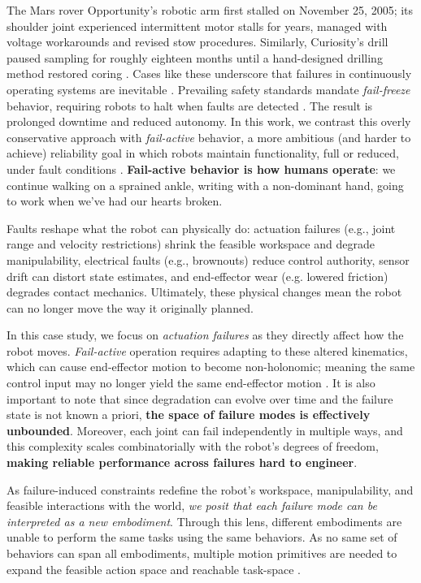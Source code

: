 The Mars rover Opportunity's robotic arm first stalled on November 25, 2005; its shoulder joint experienced intermittent motor stalls for years, managed with voltage workarounds and revised stow procedures. Similarly, Curiosity's drill paused sampling for roughly eighteen months until a hand-designed drilling method restored coring \cite{nasa_science_first_drilled_sample_2018,jpl_opportunity_shoulder_2008}. Cases like these underscore that failures in continuously operating systems are inevitable \cite{factory_efficiency_2020}. Prevailing safety standards mandate \textsl{fail-freeze} behavior, requiring robots to halt when faults are detected \cite{ISO10218-1,ISO13849-1,IEC60204-1}. The result is prolonged downtime and reduced autonomy.
In this work, we contrast this overly conservative approach with \textsl{fail-active} behavior, a more ambitious (and harder to achieve) reliability goal in which robots maintain functionality, full or reduced, under fault conditions \cite{aero_reliability}. \textbf{Fail-active behavior is how humans operate}: we continue walking on a sprained ankle, writing with a non-dominant hand, going to work when we've had our hearts broken.

Faults reshape what the robot can physically do: actuation failures (e.g., joint range and velocity restrictions) shrink the feasible workspace and degrade manipulability, electrical faults (e.g., brownouts) reduce control authority, sensor drift can distort state estimates, and end-effector wear (e.g. lowered friction) degrades contact mechanics. Ultimately, these physical changes mean the robot can no longer move the way it originally planned.

In this case study, we focus on \textit{actuation failures} as they directly affect how the robot moves. \textit{Fail-active} operation requires adapting to these altered kinematics, which can cause end-effector motion to become non-holonomic; meaning the same control input may no longer yield the same end-effector motion \cite{Bloch_Krishnaprasad_Murray_2016}.
It is also important to note that since degradation can evolve over time \cite{barbieri2015sensor} and the failure state is not known a priori, \textbf{the space of failure modes is effectively unbounded}. Moreover, each joint can fail independently in multiple ways, and this complexity scales combinatorially with the robot's degrees of freedom, \textbf{making reliable performance across failures hard to engineer}.

As failure-induced constraints redefine the robot's workspace, manipulability, and feasible interactions with the world, \textsl{we posit that each failure mode can be interpreted as a new embodiment}.
Through this lens, different embodiments are unable to perform the same tasks using the same behaviors. As no same set of behaviors can span all embodiments, multiple motion primitives are needed to expand the feasible action space and reachable task-space \cite{briscoe2024exploring}.

